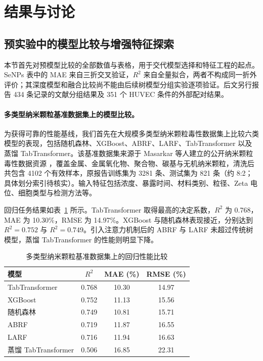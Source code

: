 \section{结果与讨论}

\subsection{预实验中的模型比较与增强特征探索}

本节首先对预模型比较的全部数值与表格，用于交代模型选择和特征工程的起点。SeNPs 表中的 MAE 来自三折交叉验证，$R^2$ 来自全量拟合，两者不构成同一折外评价；其深度模型和融合比较尚不能由后续树模型分组实验逐项验证。后文另行报告 434 条记录的文献分组结果及 351 个 HUVEC 条件的外部配对结果。


\paragraph{多类型纳米颗粒基准数据集上的模型比较。}
为获得可靠的性能基线，我们首先在大规模多类型纳米颗粒毒性数据集上比较六类模型的表现，包括随机森林\cite{breiman2001random}、XGBoost\cite{chen2016xgboost}、ABRF\cite{gromov2022attention}、LARF\cite{gromov2022larf}、TabTransformer\cite{huang2020tabtransformer} 以及蒸馏 TabTransformer\cite{hinton2015distilling}。该基准数据集来源于 Masarkar 等人建立的公开纳米颗粒毒性数据资源 \cite{masarkar2024}，覆盖金属、金属氧化物、聚合物、碳基与无机纳米颗粒，清洗后共包含 4102 个有效样本，原报告训练集为 3281 条、测试集为 821 条（约 8:2；具体划分索引待核实）。输入特征包括浓度、暴露时间、材料类别、粒径、Zeta 电位、细胞类型与检测方法等。

回归任务结果如表~\ref{tab:benchmark_regression} 所示。TabTransformer 取得最高的决定系数，$R^2$ 为 0.768，MAE 为 10.30\%，RMSE 为 14.97\%。XGBoost 与随机森林表现接近，分别达到 $R^2=0.752$ 与 $R^2=0.749$。引入注意力机制后的 ABRF 与 LARF 未超过传统树模型，蒸馏 TabTransformer 的性能则明显下降。

\begin{table}[htbp]
  \centering
  \caption{多类型纳米颗粒基准数据集上的回归性能比较}
  \label{tab:benchmark_regression}
  \begin{tabular}{lccc}
    \hline
    模型 & $R^2$ & MAE (\%) & RMSE (\%) \\
    \hline
    TabTransformer & 0.768 & 10.30 & 14.97 \\
    XGBoost & 0.752 & 11.13 & 15.56 \\
    随机森林 & 0.749 & 10.81 & 15.71 \\
    ABRF & 0.719 & 11.87 & 16.55 \\
    LARF & 0.716 & 11.94 & 16.63 \\
    蒸馏 TabTransformer & 0.506 & 16.85 & 22.31 \\
    \hline
  \end{tabular}
\end{table}

